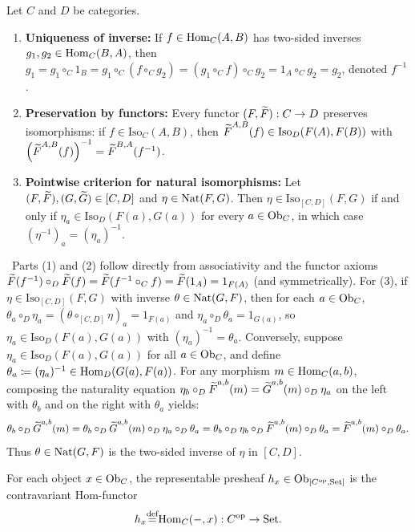 \documentclass[10pt,a4paper]{article}
\begin{document}
\begin{theorem}\label{thm:nat_iso}
Let $C$ and $D$ be categories.
\begin{enumerate}
\item \textbf{Uniqueness of inverse:} If $f \in {\textrm{Hom}}_C(A,B)$ has two-sided inverses $g_1, g_2 \in {\textrm{Hom}}_C(B,A)$, then $g_1 = g_1 \circ_C 1_B = g_1 \circ_C (f \circ_C g_2) = (g_1 \circ_C f) \circ_C g_2 = 1_A \circ_C g_2 = g_2$, denoted $f^{-1}$.
\item \textbf{Preservation by functors:} Every functor $(F, {\widetilde{F}\textrm{}}) : C \to D$ preserves isomorphisms: if $f \in \mathrm{Iso}_C(A,B)$, then ${\widetilde{F}\textrm{}}^{A,B}(f) \in \mathrm{Iso}_D(F(A), F(B))$ with $\left({\widetilde{F}\textrm{}}^{A,B}(f)\right)^{-1} = {\widetilde{F}\textrm{}}^{B,A}(f^{-1})$.
\item \textbf{Pointwise criterion for natural isomorphisms:} Let $(F, {\widetilde{F}\textrm{}}), (G, {\widetilde{G}\textrm{}}) \in [C, D]$ and $\eta \in {\textrm{Nat}}(F, G)$. Then $\eta \in \mathrm{Iso}_{[C,D]}(F, G)$ if and only if $\eta_a \in \mathrm{Iso}_D(F(a), G(a))$ for every $a \in {\textrm{Ob}}_C$, in which case $(\eta^{-1})_a = (\eta_a)^{-1}$.
\end{enumerate}
\end{theorem}
\myprf\ Parts (1) and (2) follow directly from associativity and the functor axioms ${\widetilde{F}\textrm{}}(f^{-1}) \circ_D {\widetilde{F}\textrm{}}(f) = {\widetilde{F}\textrm{}}(f^{-1} \circ_C f) = {\widetilde{F}\textrm{}}(1_A) = 1_{F(A)}$ (and symmetrically). For (3), if $\eta \in \mathrm{Iso}_{[C,D]}(F, G)$ with inverse $\theta \in {\textrm{Nat}}(G, F)$, then for each $a \in {\textrm{Ob}}_C$, $\theta_a \circ_D \eta_a = (\theta \circ_{[C,D]} \eta)_a = 1_{F(a)}$ and $\eta_a \circ_D \theta_a = 1_{G(a)}$, so $\eta_a \in \mathrm{Iso}_D(F(a), G(a))$ with $(\eta_a)^{-1} = \theta_a$. Conversely, suppose $\eta_a \in \mathrm{Iso}_D(F(a), G(a))$ for all $a \in {\textrm{Ob}}_C$, and define $\theta_a \coloneqq (\eta_a)^{-1} \in {\textrm{Hom}}_D(G(a), F(a))$. For any morphism $m \in {\textrm{Hom}}_C(a,b)$, composing the naturality equation $\eta_b \circ_D {\widetilde{F}\textrm{}}^{a,b}(m) = {\widetilde{G}\textrm{}}^{a,b}(m) \circ_D \eta_a$ on the left with $\theta_b$ and on the right with $\theta_a$ yields:
$$\theta_b \circ_D {\widetilde{G}\textrm{}}^{a,b}(m) = \theta_b \circ_D {\widetilde{G}\textrm{}}^{a,b}(m) \circ_D \eta_a \circ_D \theta_a = \theta_b \circ_D \eta_b \circ_D {\widetilde{F}\textrm{}}^{a,b}(m) \circ_D \theta_a = {\widetilde{F}\textrm{}}^{a,b}(m) \circ_D \theta_a.$$
Thus $\theta \in {\textrm{Nat}}(G, F)$ is the two-sided inverse of $\eta$ in $[C, D]$. \myqed

\begin{definition}
For each object $x \in {\textrm{Ob}}_C$, the representable presheaf $h_x \in {\textrm{Ob}}_{[C^{\textrm{op}},{\textrm{Set}}]}$ is the contravariant Hom-functor
$$h_x {\stackrel{{\textrm{def}}}{=}} {\textrm{Hom}}_C(-, x) : C^{\textrm{op}} \to {\textrm{Set}}.$$
\end{definition}
\end{document}
